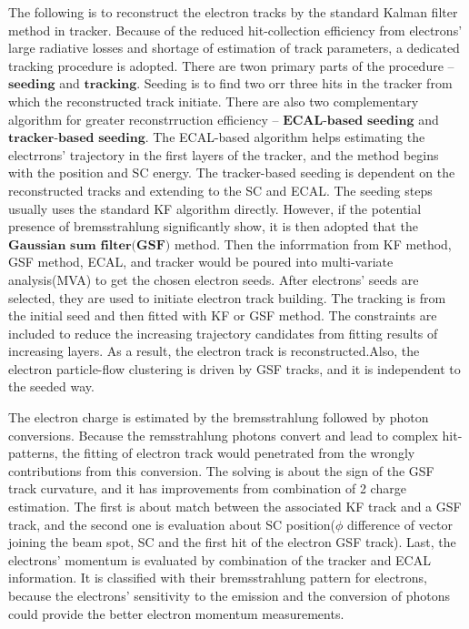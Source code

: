 			The following is to reconstruct the electron tracks by the standard Kalman filter method in tracker. Because of the reduced hit-collection efficiency from electrons' large radiative losses and shortage of estimation of track parameters, a dedicated tracking procedure is adopted. There are twon primary parts of the procedure -- $\textbf{seeding}$ and $\textbf{tracking}$. Seeding is to find two orr three hits in the tracker from which the reconstructed track initiate. There are also two complementary algorithm for greater reconstrruction efficiency -- $\textbf{ECAL-based}$ $\textbf{seeding}$ and $\textbf{tracker-based}$ $\textbf{seeding}$. The ECAL-based algorithm helps estimating the electrrons' trajectory in the first layers of the tracker, and the method begins with the position and SC energy. The tracker-based seeding is dependent on the reconstructed tracks and extending to the SC and ECAL. The seeding steps usually uses the standard KF algorithm directly. However, if the potential presence of bremsstrahlung significantly show, it is then adopted that the $\textbf{Gaussian}$ $\textbf{sum}$ $\textbf{filter}$$\textbf{(GSF)}$ method. Then the inforrmation from KF method, GSF method, ECAL, and tracker would be poured into multi-variate analysis(MVA) to get the chosen electron seeds. After electrons' seeds are selected, they are used to initiate electron track building. The tracking is from the initial seed and then fitted with KF or GSF method. The constraints are included to reduce the increasing trajectory candidates from fitting results of increasing layers. As a result, the electron track is reconstructed.Also, the electron particle-flow clustering is driven by GSF tracks, and it is independent to the seeded way.

			The electron charge is estimated by the bremsstrahlung followed by photon conversions. Because the remsstrahlung photons convert and lead to complex hit-patterns, the fitting of electron track would penetrated from the wrongly contributions from this conversion. The solving is about the sign of the GSF track curvature, and it has improvements from combination of 2 charge estimation. The first is about match between the associated KF track and a GSF track, and the second one is evaluation about SC position($\phi$ difference of vector joining the beam spot, SC and the first hit of the electron GSF track). Last, the electrons' momentum is evaluated by combination of the tracker and ECAL information. It is classified with their bremsstrahlung pattern for electrons, because the electrons' sensitivity to the emission and the conversion of photons could provide the better electron momentum measurements.

